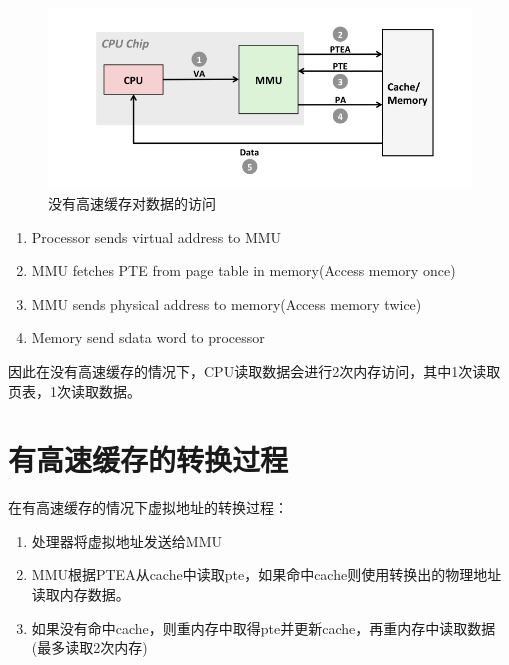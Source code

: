 \begin{figure}[htbp]
\begin{center}
\includegraphics[width=1\textwidth]{slowvava.png}
\caption{没有高速缓存对数据的访问}
\end{center}
\end{figure}

\begin{enumerate}
\item Processor sends virtual address to MMU
\item MMU fetches PTE from page table in memory(Access memory once)
\item MMU sends physical address to memory(Access memory twice)
\item Memory send sdata word to processor	
\end{enumerate}

因此在没有高速缓存的情况下，CPU读取数据会进行2次内存访问，其中1次读取页表，1次读取数据。

\section{有高速缓存的转换过程}

在有高速缓存的情况下虚拟地址的转换过程：


\begin{enumerate}
\item 处理器将虚拟地址发送给MMU
\item MMU根据PTEA从cache中读取pte，如果命中cache则使用转换出的物理地址读取内存数据。
\item 如果没有命中cache，则重内存中取得pte并更新cache，再重内存中读取数据(最多读取2次内存)
\end{enumerate}


